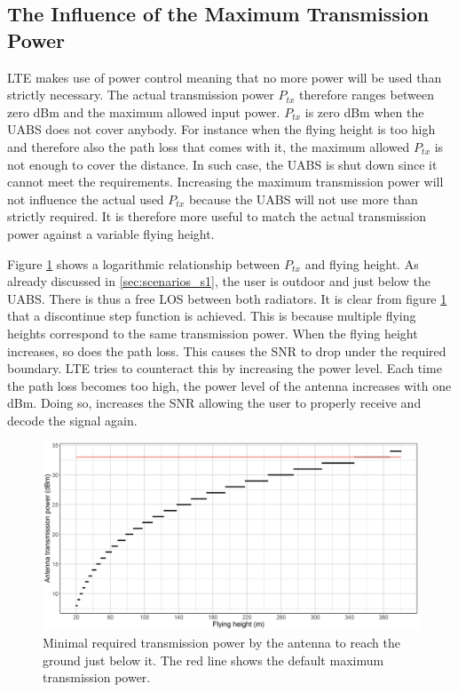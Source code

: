 \subsection{The Influence of the Maximum Transmission Power}
\label{s1a}
\gls{LTE} makes use of power control meaning that no more power will be used than strictly necessary. The actual 
transmission power $P_{tx}$ therefore ranges between zero dBm and the maximum allowed input power. $P_{tx}$ is zero dBm when the \gls{UABS} does not cover anybody.
For instance when the flying height is too high and therefore also the path loss that comes with it, the maximum allowed $P_{tx}$ is not enough to cover 
the distance. In such case, the \gls{UABS} is shut down since it cannot meet the requirements.
Increasing the maximum transmission power will not influence the actual used $P_{tx}$ because the \gls{UABS} will not use more
than strictly required. It is therefore more useful to match the actual transmission power against a variable flying height. 

Figure \ref{fig:ptxfh} shows a logarithmic relationship between $P_{tx}$ and flying height.
As already discussed in \ref{sec:scenarios_s1}, the user is outdoor and just below the \gls{UABS}. There is thus a free \gls{LOS} between both
radiators. It is clear from figure \ref{fig:ptxfh} that a discontinue step function is achieved. This is because multiple flying heights correspond to the same transmission power.
When the flying height increases, so does the path loss. This causes the \gls{SNR} to drop under the required boundary.
 \gls{LTE} tries to counteract this by increasing the power level. Each time 
the path loss becomes too high, the power level of the antenna increases with one dBm. 
Doing so, increases the \gls{SNR} allowing the user to properly receive and decode the signal again.

\begin{figure}[t]
  \centering
  \includegraphics[width=\textwidth]{../results/s1/ptx.png}
  \caption{Minimal required transmission power by the antenna to reach the ground just below it. The red line shows the default maximum transmission power.}
  \label{fig:ptxfh}
\end{figure}

